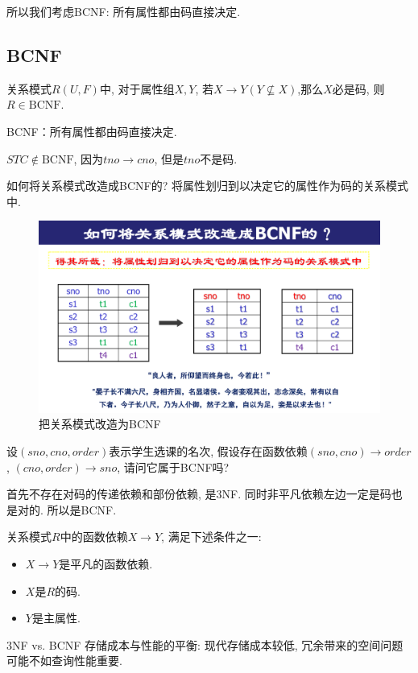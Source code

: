 所以我们考虑BCNF: 所有属性都由码直接决定.

\subsection{BCNF}

\begin{definition}[BCNF]
  关系模式$R(U,F)$中, 对于属性组$X,Y$, 若$X\to Y(Y\nsubseteq X)$,那么$X$必是码, 则$R\in\text{BCNF}$.
\end{definition}

BCNF：所有属性都由码直接决定.

$STC\notin \text{BCNF}$, 因为$tno\to cno$, 但是$tno$不是码.

如何将关系模式改造成BCNF的? 将属性划归到以决定它的属性作为码的关系模式中.

\begin{figure}[H]
    \centering
    \includegraphics[width=.6\textwidth]{./figure/BCNF.pdf}
    \caption{把关系模式改造为BCNF}
\end{figure}


\begin{example}
  设$(sno,cno,order)$表示学生选课的名次, 假设存在函数依赖$(sno,cno)\to order$, $(cno,order)\to sno$, 请问它属于BCNF吗?

  首先不存在对码的传递依赖和部份依赖, 是3NF. 同时非平凡依赖左边一定是码也是对的. 所以是BCNF.
\end{example}

\begin{definition}[3NF]
  关系模式$R$中的函数依赖$X\to Y$, 满足下述条件之一:
  \begin{itemize}
    \item $X\to Y$是平凡的函数依赖.
    \item $X$是$R$的码.
    \item $Y$是主属性.
  \end{itemize}
\end{definition}

3NF vs. BCNF\quad
存储成本与性能的平衡: 现代存储成本较低, 冗余带来的空间问题可能不如查询性能重要.

